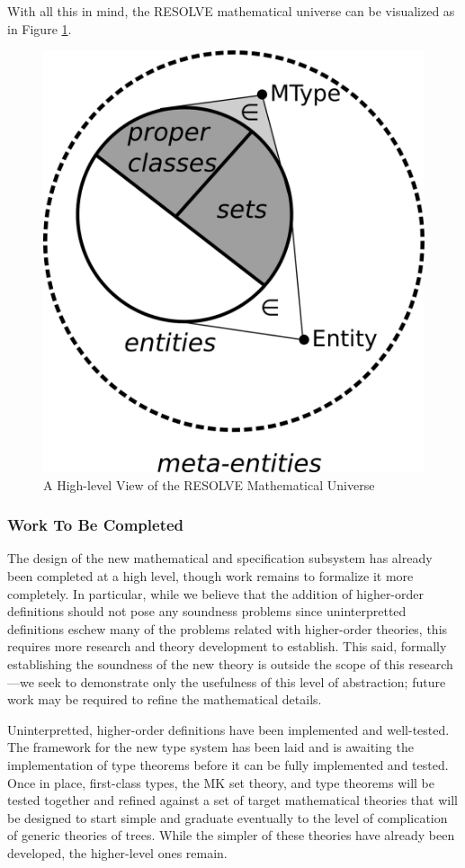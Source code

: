 With all this in mind, the RESOLVE mathematical universe can be visualized as in Figure \ref{fig:universe}.

\begin{figure}
  \centering
    \includegraphics[width=.33\textwidth]{universe}
  \caption{A High-level View of the RESOLVE Mathematical Universe\label{fig:universe}}
\end{figure}

\subsubsection{Work To Be Completed}
The design of the new mathematical and specification subsystem has already been completed at a high level, though work remains to formalize it more completely. In particular, while we believe that the addition of higher-order definitions should not pose any soundness problems since uninterpretted definitions eschew many of the problems related with higher-order theories, this requires more research and theory development to establish.  This said, formally establishing the soundness of the new theory is outside the scope of this research---we seek to demonstrate only the usefulness of this level of abstraction; future work may be required to refine the mathematical details.

Uninterpretted, higher-order definitions have been implemented and well-tested.  The framework for the new type system has been laid and is awaiting the implementation of type theorems before it can be fully implemented and tested.  Once in place, first-class types, the MK set theory, and type theorems will be tested together and refined against a set of target mathematical theories that will be designed to start simple and graduate eventually to the level of complication of generic theories of trees.  While the simpler of these theories have already been developed, the higher-level ones remain.

